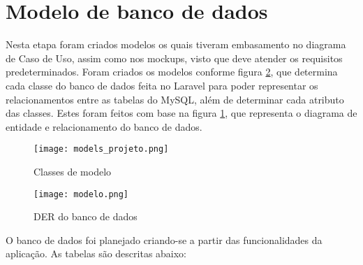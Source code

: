 \section{Modelo de banco de dados}
Nesta etapa foram criados modelos os quais tiveram embasamento no diagrama de Caso de Uso, assim como nos mockups, visto que deve atender os requisitos predeterminados. Foram criados os modelos conforme figura \ref{modelo_banco}, que determina cada classe do banco de dados feita no Laravel para poder representar os relacionamentos entre as tabelas do MySQL, além de determinar cada atributo das classes. Estes foram feitos com base na figura \ref{models_projeto}, que representa o diagrama de entidade e relacionamento do banco de dados.
\begin{figure}[H]
    \caption{\label{models_projeto}Classes de modelo}
    \vspace{5pt}
    \centering
    \texttt{[image: models\_projeto.png]}
    \vspace{5pt}
\end{figure}
\begin{figure}[htbp]
    \caption{\label{modelo_banco}DER do banco de dados}
    \vspace{5pt}
    \centering
    \texttt{[image: modelo.png]}
    \vspace{5pt}
\end{figure}
O banco de dados foi planejado criando-se a partir das funcionalidades da aplicação. As tabelas são descritas abaixo:
